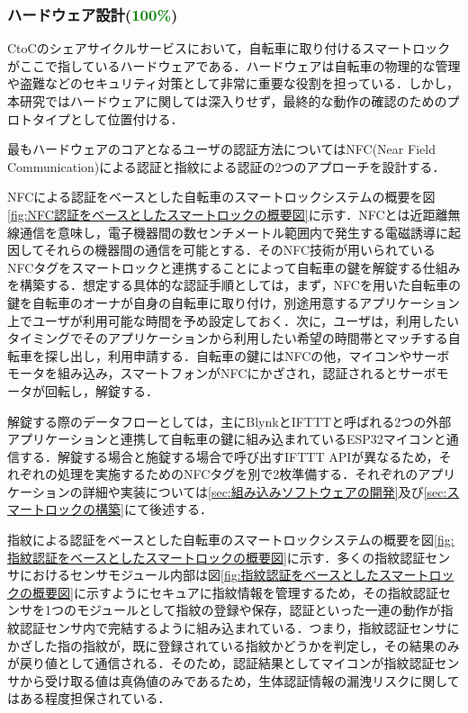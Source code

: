       \subsubsection{ハードウェア設計(\textcolor{green}{100\%})}
        \label{sec:ハードウェア設計}
          \par CtoCのシェアサイクルサービスにおいて，自転車に取り付けるスマートロックがここで指しているハードウェアである．ハードウェアは自転車の物理的な管理や盗難などのセキュリティ対策として非常に重要な役割を担っている．しかし，本研究ではハードウェアに関しては深入りせず，最終的な動作の確認のためのプロトタイプとして位置付ける．
          \par 最もハードウェアのコアとなるユーザの認証方法についてはNFC(Near Field Communication)による認証と指紋による認証の2つのアプローチを設計する．
          \par NFCによる認証をベースとした自転車のスマートロックシステムの概要を図\ref{fig:NFC認証をベースとしたスマートロックの概要図}に示す．NFCとは近距離無線通信を意味し，電子機器間の数センチメートル範囲内で発生する電磁誘導に起因してそれらの機器間の通信を可能とする．そのNFC技術が用いられているNFCタグをスマートロックと連携することによって自転車の鍵を解錠する仕組みを構築する．想定する具体的な認証手順としては，まず，NFCを用いた自転車の鍵を自転車のオーナが自身の自転車に取り付け，別途用意するアプリケーション上でユーザが利用可能な時間を予め設定しておく．次に，ユーザは，利用したいタイミングでそのアプリケーションから利用したい希望の時間帯とマッチする自転車を探し出し，利用申請する．自転車の鍵にはNFCの他，マイコンやサーボモータを組み込み，スマートフォンがNFCにかざされ，認証されるとサーボモータが回転し，解錠する．
          \par 解錠する際のデータフローとしては，主にBlynkとIFTTTと呼ばれる2つの外部アプリケーションと連携して自転車の鍵に組み込まれているESP32マイコンと通信する．解錠する場合と施錠する場合で呼び出すIFTTT APIが異なるため，それぞれの処理を実施するためのNFCタグを別で2枚準備する．それぞれのアプリケーションの詳細や実装については\ref{sec:組み込みソフトウェアの開発}及び\ref{sec:スマートロックの構築}にて後述する．
          \par 指紋による認証をベースとした自転車のスマートロックシステムの概要を図\ref{fig:指紋認証をベースとしたスマートロックの概要図}に示す．多くの指紋認証センサにおけるセンサモジュール内部は図\ref{fig:指紋認証をベースとしたスマートロックの概要図}に示すようにセキュアに指紋情報を管理するため，その指紋認証センサを1つのモジュールとして指紋の登録や保存，認証といった一連の動作が指紋認証センサ内で完結するように組み込まれている．つまり，指紋認証センサにかざした指の指紋が，既に登録されている指紋かどうかを判定し，その結果のみが戻り値として通信される．そのため，認証結果としてマイコンが指紋認証センサから受け取る値は真偽値のみであるため，生体認証情報の漏洩リスクに関してはある程度担保されている．
